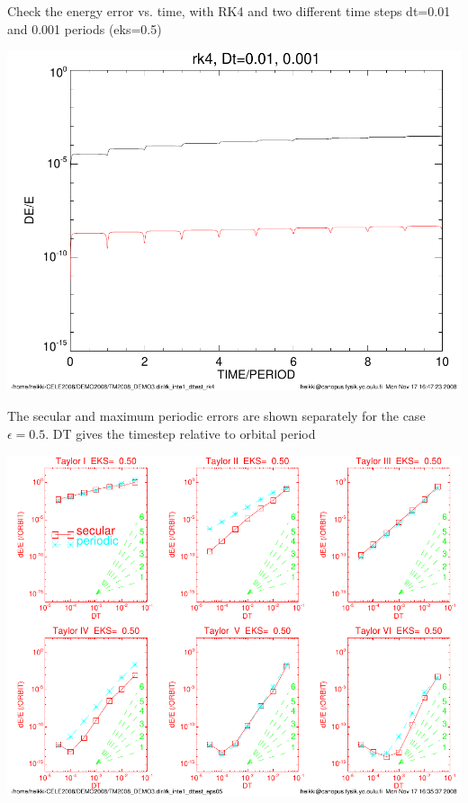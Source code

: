 \documentclass[a4paper,12pt]{article}
\begin{document}
{{\vspace {1cm}

{\bf {}}
Check the energy error vs. time, with RK4 and two different time steps dt=0.01 and 0.001 periods (eks=0.5)

\includegraphics[angle=0,width=0.35\paperwidth]{rk_inte1_dttest_rk4.pdf}



\vspace {1cm}

\newpage

{\bf {}}


The secular and maximum periodic errors are shown separately
for the case $\epsilon=0.5$. DT gives the timestep relative to orbital period


\includegraphics[width=0.75\paperwidth]{rk_inte1_dttest_eps05.pdf}








}}
\end{document}
